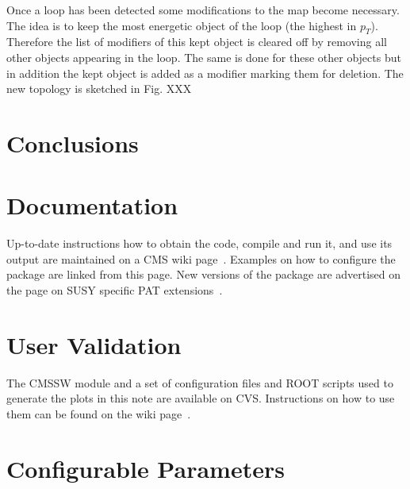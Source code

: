 \documentclass{cmspaper}
\begin{document}
Once a loop has been detected some modifications to the map become necessary.
The idea is to keep the most energetic object of the loop (the highest in
$p_T$). Therefore the list of modifiers of this kept object is cleared off by
removing all other objects appearing in the loop. %
The same is done for these other objects but in addition the kept object is
added as a modifier marking them for deletion. The new topology is sketched in
Fig. XXX %

\section{Conclusions}


\section{Documentation}
Up-to-date instructions how to obtain the code, compile and run it, and use its
output are maintained on a CMS wiki page~\cite{twiki}. Examples on how to
configure the package are linked from this page. New versions of the package are
advertised on the page on SUSY specific PAT extensions~\cite{susypat}.




\section{User Validation}
The CMSSW module and a set of configuration files and ROOT scripts used to
generate the plots in this note are available on CVS. Instructions on how to use
them can be found on the wiki page~\cite{twiki}.


\appendix
\section{Configurable Parameters}
\end{document}
